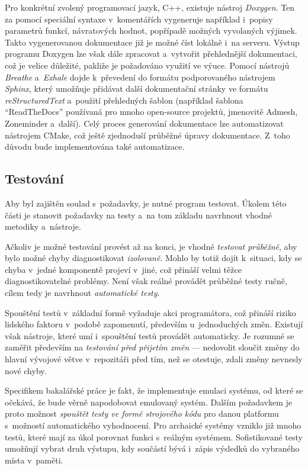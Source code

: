 Pro konkrétní zvolený programovací jazyk, C++, existuje nástroj \emph{Doxygen}. Ten za pomocí speciální syntaxe v~komentářích vygeneruje například i~popisy parametrů funkcí, návratových hodnot, popřípadě možných vyvolaných výjimek. Takto vygenerovanou dokumentace již je možné číst lokálně i~na serveru. Výstup programu Doxygen lze však dále zpracovat a~vytvořit přehlednější dokumentaci, což je velice důležité, pakliže je požadováno využití ve výuce. Pomocí nástrojů \emph{Breathe} a~\emph{Exhale} dojde k~převedení do formátu podporovaného nástrojem \emph{Sphinx}, který umožňuje přidávat další dokumentační stránky ve formátu \emph{reStructuredText} a~použití přehledných šablon (například šablona \enquote{ReadTheDocs} používaná pro mnoho open-source projektů, jmenovitě Admesh, Zoneminder a~další). Celý proces generování dokumentace lze automatizovat nástrojem CMake, což ještě zjednoduší průběžné úpravy dokumentace. Z~toho důvodu bude implementována také automatizace.

\subsection{Testování}
Aby byl zajištěn soulad s~požadavky, je nutné program testovat. Úkolem této části je stanovit požadavky na testy a~na tom základu navrhnout vhodné metodiky a~nástroje.

Ačkoliv je možné testování provést až na konci, je vhodné \emph{testovat průběžně}, aby bylo možné chyby diagnostikovat \emph{izolovaně}. Mohlo by totiž dojít k~situaci, kdy se chyba v~jedné komponentě projeví v~jiné, což přináší velmi těžce diagnostikovatelné problémy. Není však reálné provádět průběžné testy ručně, cílem tedy je navrhnout \emph{automatické testy}.

Spouštění testů v~základní formě vyžaduje akci programátora, což přináší riziko lidského faktoru v~podobě zapomenutí, především u~jednoduchých změn. Existují však nástroje, které umí i~spouštění testů provádět automaticky. Je rozumné se zaměřit především na \emph{testování před přijetím změn} --- nedovolit sloučit změny do hlavní vývojové větve v~repozitáři před tím, než se otestuje, zdali změny nevnesly nové chyby.

Specifikem bakalářské práce je fakt, že implementuje emulaci systému, od které se očekává, že bude věrně napodobovat emulovaný systém. Dalším požadavkem je proto možnost \emph{spouštět testy ve formě strojového kódu} pro danou platformu s~možností automatického vyhodnocení. Pro archaické systémy vzniklo již mnoho testů, které mají za úkol porovnat funkci s~reálným systémem. Sofistikované testy umožňují vybrat druh výstupu, kdy součástí bývá i~zápis výsledků do vybraného místa v~paměti.

